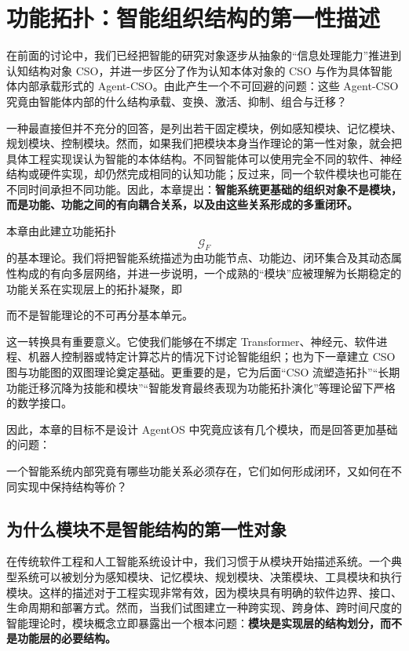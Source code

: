 \chapter{功能拓扑：智能组织结构的第一性描述}

\begin{chapterlead}
在前面的讨论中，我们已经把智能的研究对象逐步从抽象的“信息处理能力”推进到认知结构对象 CSO，并进一步区分了作为认知本体对象的 CSO 与作为具体智能体内部承载形式的 Agent-CSO。由此产生一个不可回避的问题：这些 Agent-CSO 究竟由智能体内部的什么结构承载、变换、激活、抑制、组合与迁移？

一种最直接但并不充分的回答，是列出若干固定模块，例如感知模块、记忆模块、规划模块、控制模块。然而，如果我们把模块本身当作理论的第一性对象，就会把具体工程实现误认为智能的本体结构。不同智能体可以使用完全不同的软件、神经结构或硬件实现，却仍然完成相同的认知功能；反过来，同一个软件模块也可能在不同时间承担不同功能。因此，本章提出：\textbf{智能系统更基础的组织对象不是模块，而是功能、功能之间的有向耦合关系，以及由这些关系形成的多重闭环。}

本章由此建立功能拓扑
\[
\mathcal G_F
\]
的基本理论。我们将把智能系统描述为由功能节点、功能边、闭环集合及其动态属性构成的有向多层网络，并进一步说明，一个成熟的“模块”应被理解为长期稳定的功能关系在实现层上的拓扑凝聚，即
\begin{statementbox}
\centering
{}
\end{statementbox}
而不是智能理论的不可再分基本单元。

这一转换具有重要意义。它使我们能够在不绑定 Transformer、神经元、软件进程、机器人控制器或特定计算芯片的情况下讨论智能组织；也为下一章建立 CSO 图与功能图的双图理论奠定基础。更重要的是，它为后面“CSO 流塑造拓扑”“长期功能迁移沉降为技能和模块”“智能发育最终表现为功能拓扑演化”等理论留下严格的数学接口。

因此，本章的目标不是设计 AgentOS 中究竟应该有几个模块，而是回答更加基础的问题：
\begin{statementbox}
一个智能系统内部究竟有哪些功能关系必须存在，它们如何形成闭环，又如何在不同实现中保持结构等价？
\end{statementbox}
\end{chapterlead}


\section{为什么模块不是智能结构的第一性对象}

在传统软件工程和人工智能系统设计中，我们习惯于从模块开始描述系统。一个典型系统可以被划分为感知模块、记忆模块、规划模块、决策模块、工具模块和执行模块。这样的描述对于工程实现非常有效，因为模块具有明确的软件边界、接口、生命周期和部署方式。然而，当我们试图建立一种跨实现、跨身体、跨时间尺度的智能理论时，模块概念立即暴露出一个根本问题：\textbf{模块是实现层的结构划分，而不是功能层的必要结构。}

